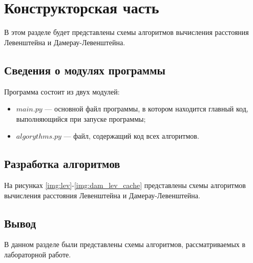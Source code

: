 \chapter{Конструкторская часть}
В этом разделе будет представлены схемы алгоритмов вычисления расстояния Левенштейна и Дамерау-Левенштейна.


\section{Сведения о модулях программы}
Программа состоит из двух модулей:
\begin{itemize}
	\item $main.py$ --- основной файл программы, в котором находится главный код, выполняющийся при запуске программы;
    \item $algorythms.py$ --- файл, содержащий код всех алгоритмов. \newline
\end{itemize}


\section{Разработка алгоритмов}
На рисунках \ref{img:lev}-\ref{img:dam_lev_cache} представлены схемы алгоритмов вычисления расстояния Левенштейна и Дамерау-Левенштейна.


\clearpage


\section{Вывод}
В данном разделе были представлены схемы алгоритмов, рассматриваемых в лабораторной работе.